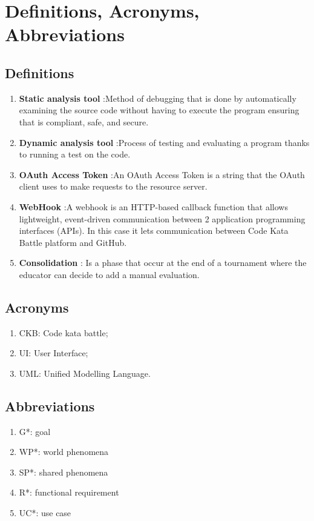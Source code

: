 \section{Definitions, Acronyms, Abbreviations}
\subsection{Definitions}
\begin{enumerate} [label=\textbullet]
    \item \textbf{Static analysis tool} :Method of debugging that is done by automatically examining the source code without having to execute the program ensuring that is  compliant, safe, and secure.
    \item \textbf{Dynamic analysis tool} :Process of testing and evaluating a program thanks to running a test on the code.
    \item \textbf{OAuth Access Token} :An OAuth Access Token is a string that the OAuth client uses to make requests to the resource server.
    \item \textbf{WebHook} :A webhook is an HTTP-based callback function that allows lightweight, event-driven communication between 2 application programming interfaces (APIs). In this case it lets communication between Code Kata Battle platform and GitHub.
    \item \textbf{Consolidation} : Is a phase that occur at the end of a tournament where the educator can decide to add a manual evaluation.
\end{enumerate}
\subsection{Acronyms}
    \begin{enumerate}[label=\textbullet]
        \item CKB: Code kata battle;
        \item UI: User Interface;
        \item UML: Unified Modelling Language.
    \end{enumerate}

\subsection{Abbreviations}
\begin{enumerate}[label=\textbullet]
    \item G*: goal
    \item WP*: world phenomena
    \item SP*: shared phenomena
    \item R*: functional requirement
    \item UC*: use case
\end{enumerate}
    
